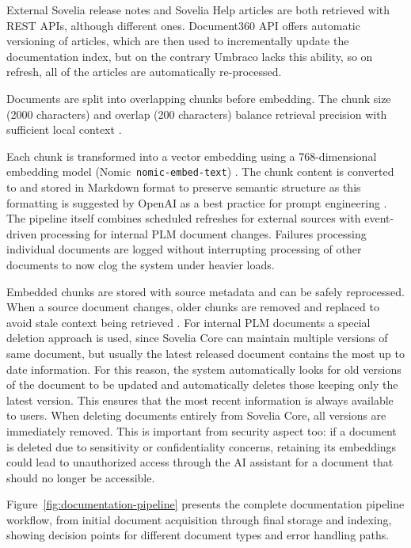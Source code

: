 External Sovelia release notes and Sovelia Help articles are both retrieved with REST APIs, although different ones. Document360 API offers automatic versioning of articles, which are then used to incrementally update the documentation index, but on the contrary Umbraco lacks this ability, so on refresh, all of the articles are automatically re-processed.

\label{subsec:pipeline-orchestration}
Documents are split into overlapping chunks before embedding. The chunk size (2000 characters) and overlap (200 characters) balance retrieval precision with sufficient local context \parencite{herediaalvaroAdvancedRetrievalaugmentedGeneration2025, shejutiExtendedAbstractEnhancing2025, LangChainOverview}.

Each chunk is transformed into a vector embedding using a 768-dimensional embedding model (Nomic \,\texttt{nomic-embed-text}) \parencite{NussbaumZach2025NETa, CuiPeng2019ASoN}. The chunk content is converted to and stored in Markdown format to preserve semantic structure as this formatting is suggested by OpenAI as a best practice for prompt engineering \parencite{openaiPromptEngineeringOpenAI}. The pipeline itself combines scheduled refreshes for external sources with event-driven processing for internal PLM document changes. Failures processing individual documents are logged without interrupting processing of other documents to now clog the system under heavier loads.

Embedded chunks are stored with source metadata and can be safely reprocessed. When a source document changes, older chunks are removed and replaced to avoid stale context being retrieved \parencite{KimothiAbhinav2025ASGt}. For internal PLM documents a special deletion approach is used, since Sovelia Core can maintain multiple versions of same document, but usually the latest released document contains the most up to date information. For this reason, the system automatically looks for old versions of the document to be updated and automatically deletes those keeping only the latest version. This ensures that the most recent information is always available to users. When deleting documents entirely from Sovelia Core, all versions are immediately removed. This is important from security aspect too: if a document is deleted due to sensitivity or confidentiality concerns, retaining its embeddings could lead to unauthorized access through the AI assistant for a document that should no longer be accessible.

Figure~\ref{fig:documentation-pipeline} presents the complete documentation pipeline workflow, from initial document acquisition through final storage and indexing, showing decision points for different document types and error handling paths.


